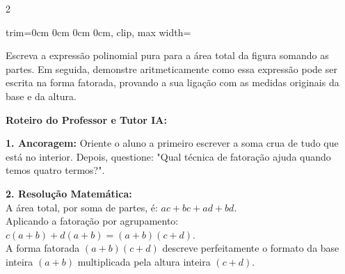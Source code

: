 \begin{multicols*}{2}
\begin{enunciadoLiteral}
\begin{center}
\begin{adjustbox}{trim=0cm 0cm 0cm 0cm, clip, max width=\larguraTikz}
\end{adjustbox}
\end{center}

Escreva a expressão polinomial pura para a área total da figura somando as partes. Em seguida, demonstre aritmeticamente como essa expressão pode ser escrita na forma fatorada, provando a sua ligação com as medidas originais da base e da altura.
\end{enunciadoLiteral}

\ifgabarito
    \begin{tcolorbox}[colback=CorTitUm!5, colframe=CorTitUm, boxrule=1pt, arc=4pt, left=6pt, right=6pt, top=6pt, bottom=6pt]
    \small\textbf{\textcolor{CorTitUm}{Roteiro do Professor e Tutor IA:}}\par\vspace{0.1cm}
    \color{CinzaEscuro}
    \textbf{1. Ancoragem:} Oriente o aluno a primeiro escrever a soma crua de tudo que está no interior. Depois, questione: "Qual técnica de fatoração ajuda quando temos quatro termos?".\par\vspace{0.1cm}
    \textbf{2. Resolução Matemática:}\\
    A área total, por soma de partes, é: $ac + bc + ad + bd$.\\
    Aplicando a fatoração por agrupamento:\\
    $c(a + b) + d(a + b) = (a + b)(c + d)$.\\
    A forma fatorada $(a + b)(c + d)$ descreve perfeitamente o formato da base inteira $(a+b)$ multiplicada pela altura inteira $(c+d)$.
    \end{tcolorbox}
    \vspace{0.15cm}
    

\end{multicols*}
